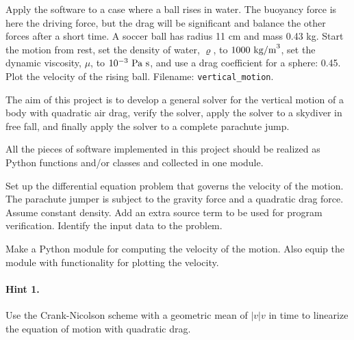 \documentclass[graybox,sectrefs,envcountresetchap,open=right,final]{svmonodo}
\makeatletter
\newenvironment{doconceexercise}{}{}
\newcounter{doconceexercisecounter}%
\newcommand\listofexercises{
\chapter*{List of Exercises, Problems, and Projects
          \@mkboth{List of Exercises, Problems, and Projects}{List of Exercises, Problems, and Projects}}
\markboth{List of Exercises, Problems, and Projects}{List of Exercises, Problems, and Projects}
\@starttoc{loe}
}
\makeatother
\begin{document}
\begin{doconceexercise}
Apply the software to a case where a ball rises in water.  The
buoyancy force is here the driving force, but the drag will be
significant and balance the other forces after a short time.  A soccer
ball has radius 11 cm and mass 0.43 kg.  Start the motion from rest, set
the density of water, $\varrho$, to $1000\hbox{ kg/m}^3$, set the
dynamic viscosity, $\mu$, to $10^{-3}\hbox{ Pa s}$, and use a drag
coefficient for a sphere: 0.45. Plot the velocity of the rising ball.
\noindent Filename: \Verb!vertical_motion!.

\end{doconceexercise}

\begin{doconceexercise}

                
\label{decay:app:exer:parachute}

The aim of this project is to develop a general solver for the
vertical motion of a body with quadratic air drag, verify the solver,
apply the solver to a skydiver in free fall, and finally apply the
solver to a complete parachute jump.

All the pieces of software implemented in this project should be
realized as Python functions and/or classes and collected in one
module.

Set up the differential equation problem that governs the velocity
of the motion.
The parachute jumper is subject to the gravity force and a quadratic
drag force. Assume constant density.
Add an extra source term to be used for program verification.
Identify the input data to the problem.


Make a Python module for computing the velocity of the motion.
Also equip the module with functionality for plotting the velocity.


\paragraph{Hint 1.}
Use the Crank-Nicolson scheme with a geometric mean of $|v|v$ in time to
linearize the equation of motion with quadratic drag.


\end{doconceexercise}
\end{document}
